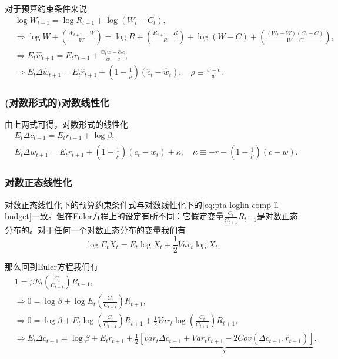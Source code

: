 对于预算约束条件来说
\begin{equation*}
  \begin{split}
    &\log W_{t+1} = \log R_{t+1} + \log (W_t - C_t), \\
    & \Rightarrow \log W + \left( \frac{W_{t+1} - W}{W}\right) = \log R + \left( \frac{R_{t+1} - R}{R}\right) + \log (W-C) + \left( \frac{\left(W_{t} - W\right)\left(C_{t} - C\right)}{W-C}\right),\\
    & \Rightarrow E_t \hat{w}_{t+1} = E_t \hat{r}_{t+1} + \frac{\hat{w}_t w - \hat{c}_t c}{w - c}, \\
    &\Rightarrow E_t \Delta \hat{w}_{t+1} = E_t \hat{r}_{t+1} + \left( 1 - \frac{1}{\rho} \right) \left( \hat{c}_t - \hat{w}_t \right), \quad \rho \equiv \frac{w-c}{w}.
  \end{split}
\end{equation*}

\subsubsection{(对数形式的)对数线性化}
由上两式可得，对数形式的线性化
\begin{align}
  \label{eq:pta-loglin-comp-ll-euler}
    &E_t \Delta c_{t+1} = E_t r_{t+1} + \log \beta,\\ \label{eq:pta-loglin-comp-ll-budget}
    &E_t \Delta w_{t+1} = E_t r_{t+1} + \left( 1 - \frac{1}{\rho} \right) \left(c_t - w_t \right) + \kappa, \quad \kappa \equiv -r - \left(1-\frac{1}{\rho} \right) \left( c - w \right).
\end{align}

\subsubsection{对数正态线性化}
对数正态线性化下的预算约束条件式与对数线性化下的\eqref{eq:pta-loglin-comp-ll-budget}一致。但在Euler方程上的设定有所不同：它假定变量$\frac{C_t}{C_{t+1}}R_{t+1}$是对数正态分布的。对于任何一个对数正态分布的变量我们有
\begin{equation*}
  \log E_t X_t = E_t \log X_t + \frac{1}{2} Var_t \log X_t.
\end{equation*}

那么回到Euler方程我们有
\begin{equation}
  \label{eq:pta-loglin-comp-ln-euler}
  \begin{split}
    &1 = \beta E_t \left(\frac{C_t}{C_{t+1}}\right) R_{t+1},\\
    &\Rightarrow 0 = \log \beta + \log E_t \left(\frac{C_t}{C_{t+1}}\right) R_{t+1}, \\
    &\Rightarrow 0= \log \beta + E_t \log \left(\frac{C_t}{C_{t+1}}\right) R_{t+1} + \frac{1}{2} Var_t \log \left(\frac{C_t}{C_{t+1}}\right) R_{t+1}, \\
    &\Rightarrow E_t \Delta c_{t+1} = \log \beta + E_t r_{t+1} + \underbrace{\frac{1}{2} \left[
    var_t \Delta c_{t+1} + Var_t r_{t+1} - 2 Cov \left(\Delta c_{t+1}, r_{t+1}\right)
    \right]}_{\chi}.
   \end{split}
\end{equation}

